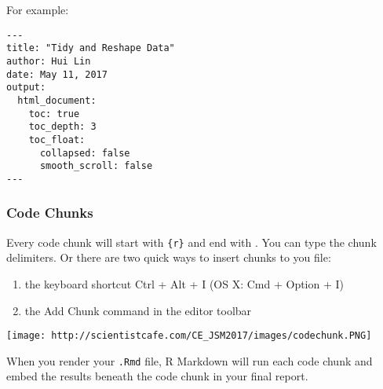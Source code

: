 \documentclass[
]{article}
\providecommand{\tightlist}{%
  \setlength{\itemsep}{0pt}\setlength{\parskip}{0pt}}
\begin{document}
For example:

\begin{verbatim}
---
title: "Tidy and Reshape Data"
author: Hui Lin
date: May 11, 2017
output:
  html_document:
    toc: true
    toc_depth: 3
    toc_float:
      collapsed: false
      smooth_scroll: false
---
\end{verbatim}

\hypertarget{code-chunks}{%
\subsubsection{Code Chunks}\label{code-chunks}}

Every code chunk will start with
\texttt{\textasciigrave{}\textasciigrave{}\textasciigrave{}\{r\}} and
end with \texttt{\textasciigrave{}\textasciigrave{}\textasciigrave{}}.
You can type the chunk delimiters. Or there are two quick ways to insert
chunks to you file:

\begin{enumerate}
\def\labelenumi{(\arabic{enumi})}
\tightlist
\item
  the keyboard shortcut Ctrl + Alt + I (OS X: Cmd + Option + I)
\item
  the Add Chunk command in the editor toolbar
\end{enumerate}

\texttt{[image: http://scientistcafe.com/CE\_JSM2017/images/codechunk.PNG]}

When you render your \texttt{.Rmd} file, R Markdown will run each code
chunk and embed the results beneath the code chunk in your final report.
\end{document}
